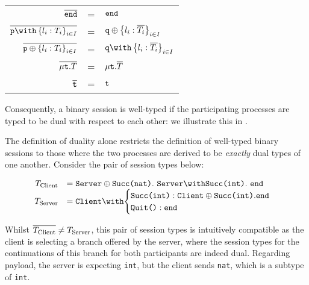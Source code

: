 \renewcommand{\arraystretch}{1.6}
\begin{center}
\begin{tabular}{rcl}
$\dual{\tend}$ & = & $\tend$ \\
$\dual{\tbra{p}{l_i: T_i}{i\in I}}$ & = & 
	$\tsel{q}{l_i: \dual{T_i}}{i\in I}$ \\
$\dual{\tsel{p}{l_i: T_i}{i\in I}}$ & = & 
	$\tbra{q}{l_i: \dual{T_i}}{i\in I}$ \\
$\dual{\trec{T}}$ & = & $\trec{\dual{T}}$ \\
$\dual{\trecvar}$ & = & $\trecvar$ \\ 
\end{tabular}
\label{table:dual}
\end{center}
\renewcommand{\arraystretch}{1}

Consequently, a binary session is well-typed 
if the participating processes are typed to be 
dual with respect to each other: 
we illustrate this in .

\begin{prooftree}
\end{prooftree}

The definition of duality alone 
restricts the definition of 
well-typed binary sessions to those
where the two processes are derived to be 
\textit{exactly} dual types of one another. 
Consider the pair of session types below:

\[
\begin{array}{rl}
T_{\text{Client}} &= 
	\tselone{Server}{\tmsg{Succ(nat)}}.~
	\tbraone{Server}{\tmsg{Succ(int)}}.~
	\tend \\
T_{\text{Server}} &= \tbraone{Client}{
\begin{cases}
	\tmsg{Succ(int)}: \tselone{Client}{\tmsg{Succ(int)}}. \tend \\
	\tmsg{Quit()}:  \tend \\
\end{cases}
} \\
\end{array}
\]

Whilst $\dual{T_{\text{Client}}} \neq T_{\text{Server}}$, 
this pair of session types is intuitively compatible 
as the client is selecting a branch offered by the server, 
where the session types for the continuations of 
this branch for both participants are indeed dual.
Regarding payload, the server is expecting \texttt{int},
but the client sends \texttt{nat}, which is a subtype of \texttt{int}.

